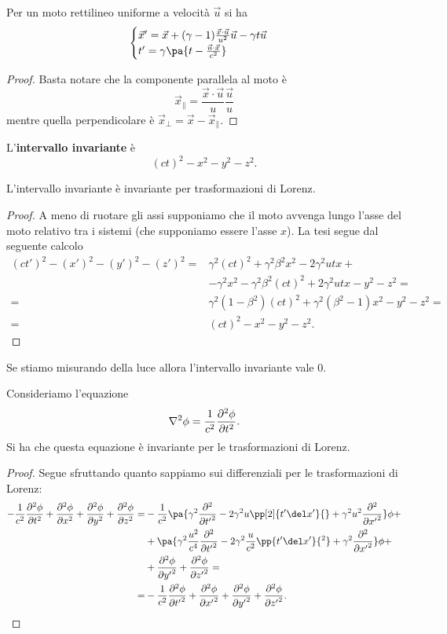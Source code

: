 \begin{proposition}\label{LorenzDirezioneArbitraria}
Per un moto rettilineo uniforme a velocit\`a $\vec u$ si ha
\[\begin{cases}
\vec x'=\vec x+(\gamma -1)\frac{\vec x\cdot \vec u}{u^2}\vec u-\gamma t \vec u\\
t'=\gamma\pa{t-\frac{\vec u\cdot \vec x}{c^2}}
\end{cases}\]
\end{proposition}
\begin{proof}
Basta notare che la componente parallela al moto \`e
\[\vec x_\parallel=\frac{\vec x\cdot \vec u}{u}\frac{\vec u}{u}\]
mentre quella perpendicolare \`e $\vec x_\perp=\vec x-\vec x_\parallel$.
\end{proof}


\begin{definition}
L'\textbf{intervallo invariante} \`e
\[(ct)^2-x^2-y^2-z^2.\]
\end{definition}
\begin{proposition}
L'intervallo invariante \`e invariante per trasformazioni di Lorenz.
\end{proposition}
\begin{proof}
A meno di ruotare gli assi supponiamo che il moto avvenga lungo l'asse del moto relativo tra i sistemi (che supponiamo essere l'asse $x$). La tesi segue dal seguente calcolo
\begin{align*}
(ct')^2-(x')^2-(y')^2-(z')^2=&\gamma^2(ct)^2+\gamma^2\beta^2x^2-2\gamma^2 utx+\\
&-\gamma^2x^2-\gamma^2\beta^2(ct)^2+2\gamma^2 u tx-y^2-z^2=\\
=&\gamma^2(1-\beta^2)(ct)^2+\gamma^2(\beta^2-1)x^2-y^2-z^2=\\
=&(ct)^2-x^2-y^2-z^2.
\end{align*}
\end{proof}

\begin{remark}
Se stiamo misurando della luce allora l'intervallo invariante vale $0$.
\end{remark}

\begin{example}
Consideriamo l'equazione
\[\nabla^2\phi=\frac1{c^2}\pps[2]t\phi.\]
Si ha che questa equazione \`e invariante per le trasformazioni di Lorenz.
\end{example}
\begin{proof}
Segue sfruttando quanto sappiamo sui differenziali per le trasformazioni di Lorenz:
\begin{align*}
-\frac1{c^2}\pps[2]t\phi+\pps[2]x\phi+\pps[2]y\phi+\pps[2]z\phi=&-\frac1{c^2}\pa{\gamma^2\pps[2]{t'}{}-2\gamma^2 u\pp[2]{t'\del x'}{}+\gamma^2u^2\pps[2]{x'}{}}\phi+\\
&+\pa{\gamma^2\frac{u^2}{c^4}\pps[2]{t'}{}-2\gamma^2\frac{u}{c^2}\pp{t'\del x'}{^2}+\gamma^2\pps[2]{x'}{}}\phi+\\
&+\pps[2]{y'}\phi+\pps[2]{z'}\phi=\\
=&-\frac1{c^2}\pps[2]{t'}\phi+\pps[2]{x'}\phi+\pps[2]{y'}\phi+\pps[2]{z'}\phi.
\end{align*}
\end{proof}


